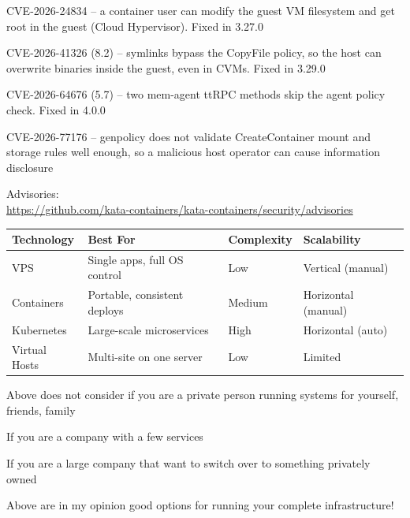 \documentclass[Screen16to9,17pt]{foils}
\begin{document}

\begin{list2}
\item CVE-2026-24834 – a container user can modify the guest VM filesystem and get root in the guest (Cloud Hypervisor). Fixed in 3.27.0
\item CVE-2026-41326 (8.2) – symlinks bypass the CopyFile policy, so the host can overwrite binaries inside the guest, even in CVMs. Fixed in 3.29.0
\item CVE-2026-64676 (5.7) – two mem-agent ttRPC methods skip the agent policy check. Fixed in 4.0.0
\item CVE-2026-77176 – genpolicy does not validate CreateContainer mount and storage rules well enough, so a malicious host operator can cause information disclosure
\item Advisories: \\ \url{https://github.com/kata-containers/kata-containers/security/advisories}
\end{list2}



\begin{center}
\begin{tabular}{|l|l|l|l|}
\hline
{\bf Technology} & {\bf Best For} & {\bf Complexity} & {\bf Scalability} \\
\hline
VPS              & Single apps, full OS control   & Low    & Vertical (manual)   \\
Containers       & Portable, consistent deploys   & Medium & Horizontal (manual) \\
Kubernetes       & Large-scale microservices      & High   & Horizontal (auto)   \\
Virtual Hosts    & Multi-site on one server       & Low    & Limited             \\
\hline
\end{tabular}
\end{center}

\begin{list2}
\item Above does not consider if you are a private person running systems for yourself, friends, family
\item If you are a company with a few services
\item If you are a large company that want to switch over to something privately owned
\item Above are in my opinion good options for running your complete infrastructure!
\end{list2}
\end{document}
